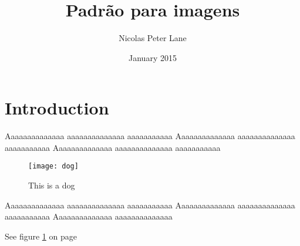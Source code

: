 \documentclass{article}
\title{Padrão para imagens}
\author{Nicolas Peter Lane}
\date{January 2015}
\begin{document}
\maketitle

\section{Introduction}
Aaaaaaaaaaaaaa aaaaaaaaaaaaaa aaaaaaaaaaa
Aaaaaaaaaaaaaa aaaaaaaaaaaaaa aaaaaaaaaaa
Aaaaaaaaaaaaaa aaaaaaaaaaaaaa aaaaaaaaaaa
\begin{figure}[h]
\centering
\texttt{[image: dog]}
\caption{This is a dog}
\label{fig:dog}
\end{figure}
Aaaaaaaaaaaaaa aaaaaaaaaaaaaa aaaaaaaaaaa
Aaaaaaaaaaaaaa aaaaaaaaaaaaaa aaaaaaaaaaa
Aaaaaaaaaaaaaa aaaaaaaaaaaaaa

See figure \ref{fig:dog} on page \pageref{fig:dog}
\end{document}
